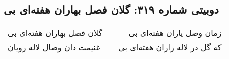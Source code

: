 \begin{center}
\section*{دوبیتی شماره ۳۱۹: گلان فصل بهاران هفته‌ای بی}
\label{sec:319}
\begin{longtable}{l p{0.5cm} r}
گلان فصل بهاران هفته‌ای بی
&&
زمان وصل یاران هفته‌ای بی
\\
غنیمت دان وصال لاله رویان
&&
که گل در لاله زاران هفته‌ای بی
\\
\end{longtable}
\end{center}
